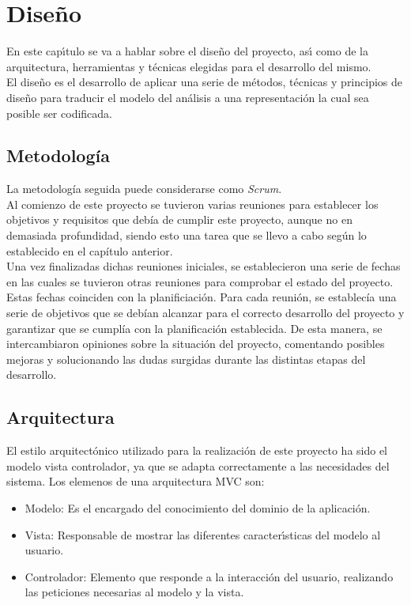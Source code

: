 \chapter{Diseño}
\label{cap:dieno}

En este capı́tulo se va a hablar sobre el diseño del proyecto, ası́ como de la arquitectura, herramientas y técnicas elegidas para el desarrollo del mismo.\\

El diseño es el desarrollo de aplicar una serie de métodos, técnicas y principios de diseño para traducir el modelo del análisis a una representación la cual sea posible ser codificada.\\

\section{Metodología}

La metodología seguida puede considerarse como \textit{Scrum}.\\

Al comienzo de este proyecto se tuvieron varias reuniones para establecer los objetivos y requisitos que debía de cumplir este proyecto, aunque no en demasiada profundidad, siendo esto una tarea que se llevo a cabo según lo establecido en el capítulo anterior.\\

Una vez finalizadas dichas reuniones iniciales, se establecieron una serie de fechas en las cuales se tuvieron otras reuniones para comprobar el estado del proyecto. Estas fechas coinciden con la planificiación. Para cada reunión, se establecía una serie de objetivos que se debían alcanzar para el correcto desarrollo del proyecto y garantizar que se cumplía con la planificación establecida. De esta manera, se intercambiaron opiniones sobre la situación del proyecto, comentando posibles mejoras y solucionando las dudas surgidas durante las distintas etapas del desarrollo.\\

\section{Arquitectura}

El estilo arquitectónico utilizado para la realización de este proyecto ha sido el modelo vista controlador, ya que se adapta correctamente a las necesidades del sistema.
Los elemenos de una arquitectura MVC son:

\begin{itemize}
\item Modelo: Es el encargado del conocimiento del dominio de la aplicación.
\item Vista: Responsable de mostrar las diferentes caracterı́sticas del modelo al usuario.
\item Controlador: Elemento que responde a la interacción del usuario, realizando las peticiones necesarias al modelo y la vista.
\end{itemize}

